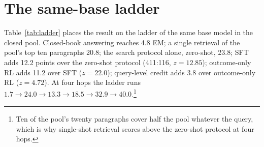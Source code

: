 \section{The same-base ladder}
\label{app:ladder}
Table~\ref{tab:ladder} places the result on the ladder of the same
base model in the closed pool. Closed-book answering reaches 4.8 EM; a
single retrieval of the pool's top ten paragraphs 20.8; the search
protocol alone, zero-shot, 23.8; SFT adds 12.2 points over the
zero-shot protocol (411:116, $z=12.85$); outcome-only RL adds 11.2 over
SFT ($z=22.0$); query-level credit adds 3.8 over outcome-only RL
($z=4.72$). At four hops the ladder runs
$1.7 \rightarrow 24.0 \rightarrow 13.3 \rightarrow 18.5 \rightarrow
32.9 \rightarrow 40.0$.\footnote{Ten of the pool's twenty paragraphs
cover half the pool whatever the query, which is why single-shot
retrieval scores above the zero-shot protocol at four hops.}

\begin{table}[t]
\centering
\small
{}
\caption{The same-base ladder on closed-pool MuSiQue dev. Every row is
the same base model (Qwen3.5-9B) under progressively more training;
the outcome-only and trajectory-level rows are means over seeds 1--3,
the query-level row is the seed-1 run of Table~\ref{tab:main-qc}.}
\label{tab:ladder}
\end{table}

